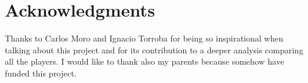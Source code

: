 \section{Acknowledgments} %
\label{sec:acknowledgments}
Thanks to Carlos Moro and Ignacio Torroba for being so inspirational when talking about this project and for its contribution to a deeper analysis comparing all the players.
I would like to thank also my parents because somehow have funded this project.
